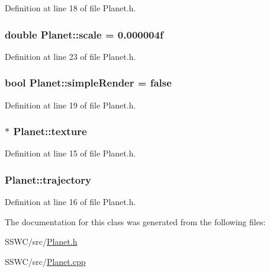 Definition at line 18 of file Planet.\+h.

\hypertarget{class_planet_a43314ec05b89111f6a3a1787cb9f8af3}{
\subsubsection[{scale}]{\setlength{\rightskip}{0pt plus 5cm}double Planet\+::scale = 0.\+000004f}}\label{class_planet_a43314ec05b89111f6a3a1787cb9f8af3}


Definition at line 23 of file Planet.\+h.

\hypertarget{class_planet_a0d455048a88b3c681a0f1480802445f8}{
\subsubsection[{simple\+Render}]{\setlength{\rightskip}{0pt plus 5cm}bool Planet\+::simple\+Render = false}}\label{class_planet_a0d455048a88b3c681a0f1480802445f8}


Definition at line 19 of file Planet.\+h.

\hypertarget{class_planet_abe80bd4546d0c412fdb14bd831e035df}{
\subsubsection[{texture}]{$\ast$ Planet\+::texture}}\label{class_planet_abe80bd4546d0c412fdb14bd831e035df}


Definition at line 15 of file Planet.\+h.

\hypertarget{class_planet_aa5996da28b63251a27728cc07f233234}{
\subsubsection[{trajectory}]{ Planet\+::trajectory}}\label{class_planet_aa5996da28b63251a27728cc07f233234}


Definition at line 16 of file Planet.\+h.



The documentation for this class was generated from the following files\+:\begin{DoxyCompactItemize}
\item 
S\+S\+W\+C/src/\hyperlink{_planet_8h}{Planet.\+h}\item 
S\+S\+W\+C/src/\hyperlink{_planet_8cpp}{Planet.\+cpp}\end{DoxyCompactItemize}
